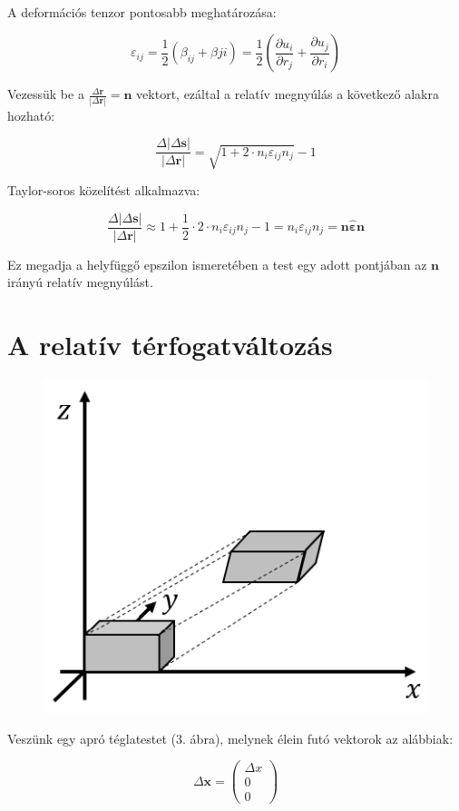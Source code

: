 \documentclass[a4paper, 12pt]{article}
\begin{document}
~

A deformációs tenzor pontosabb meghatározása:

$$\varepsilon_{ij}=\frac12(\beta_{ij}+\beta{ji})=\frac12\left(\frac{\partial u_i}{\partial r_j}+\frac{\partial u_j}{\partial r_i}\right)$$

Vezessük be a $\frac{\Delta\mathbf{r}}{|\Delta\mathbf{r}|}=\mathbf{n}$ vektort, ezáltal a relatív megnyúlás a következő alakra hozható:

$$\frac{\Delta|\Delta\mathbf{s}|}{|\Delta\mathbf{r}|}=\sqrt{1+2\cdot n_i\varepsilon_{ij}n_j}-1$$

Taylor-soros közelítést alkalmazva:

$$\frac{\Delta|\Delta\mathbf{s}|}{|\Delta\mathbf{r}|}\approx 1+\frac12\cdot 2\cdot n_i\varepsilon_{ij}n_j-1=n_i\varepsilon_{ij}n_j=\mathbf{n}\mathbf{\hat\varepsilon}\mathbf{n}$$

Ez megadja a helyfüggő epszilon ismeretében a test egy adott pontjában az $\mathbf{n}$ irányú relatív megnyúlást.


\part*{\Large{A relatív térfogatváltozás}}

\begin{figure}[h]
\centering
\includegraphics[scale=0.6]{tetel2_3.png}
\caption{}
\end{figure}

Veszünk egy apró téglatestet (3. ábra), melynek élein futó vektorok az alábbiak:

$$\Delta\mathbf{x}= \left( \begin{array}{c} \Delta x\\0\\0\end{array}\right)$$
\end{document}
